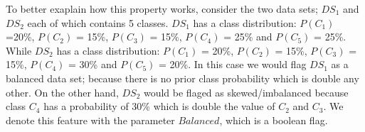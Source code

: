 To better exaplain how this property works, consider the two data sets; $DS_{1}$ and $DS_{2}$ each of which contains 5 classes.
$DS_{1}$ has a class distribution: $P(C_{1})$ =20\%, $P(C_{2})$ = 15\%, $P(C_{3})$ = 15\%, $P(C_{4})$ = 25\% and $P(C_{5})$ = 25\%.
While $DS_{2}$ has a class distribution: $P(C_{1})$ = 20\%, $P(C_{2})$ = 15\%, $P(C_{3})$ = 15\%, $P(C_{4})$ = 30\% and $P(C_{5})$ = 20\%.
In this case we would flag $DS_{1}$ as a balanced data set; because there is no prior class probability which is double any other.
On the other hand, $DS_{2}$ would be flaged as skewed/imbalanced because class $C_{4}$ has a probability of 30\% which is double the value
of $C_{2}$ and $C_{3}$. We denote this feature with the parameter $Balanced$, which is a boolean flag.

\begin{table}
\begin{center}
 \begin{longtable}{||c|c|c|c|c|c||} 
 

\end{longtable}
\end{center}
\end{table}
